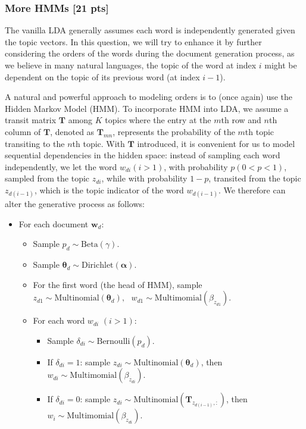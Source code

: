 \documentclass[10pt]{article}
\begin{document}
\subsubsection{More HMMs [21 pts]}
The vanilla LDA generally assumes each word is independently generated given the topic vectors. In this question, we will try to enhance it by further considering the orders of the words during the document generation process, as we believe in many natural languages, the topic of the word at index $i$ might be dependent on the topic of its previous word (at index $i-1$).

A natural and powerful approach to modeling orders is to (once again) use the Hidden Markov Model (HMM). To incorporate HMM into LDA, we assume a transit matrix $\bm{T}$ among $K$ topics where the entry at the $m$th row and $n$th column of $\bm{T}$, denoted as $\bm{T}_{mn}$, represents the probability of the $m$th topic transiting to the $n$th topic. With $\bm{T}$ introduced, it is convenient for us to model sequential dependencies in the hidden space: instead of sampling each word independently, we let the word $w_{di} (i > 1)$, with probability $p (0 < p <1)$, sampled from the topic $z_{di}$, while with probability $1-p$, transited from the topic $z_{d(i-1)}$, which is the topic indicator of the word $w_{d(i-1)}$. We therefore can alter the generative process as follows:
\begin{itemize}
\item For each document $\bm{w}_d$:
\begin{itemize}
\item Sample $p_d \sim \mbox{Beta}(\gamma)$.
\item Sample $\bm{\theta}_d \sim \mbox{Dirichlet}(\bm{\alpha})$.
\item For the first word (the head of HMM), sample $z_{d1} \sim \mbox{Multinomial}(\bm{\theta}_d), \mbox{ } w_{d1} \sim \mbox{Multimomial}(\beta_{z_{d1}})$.
\item For each word $w_{di}$ $(i > 1)$:
\begin{itemize}
\item Sample $\delta_{di}\sim \mbox{Bernoulli}(p_d)$.
\item If $\delta_{di} = 1$: sample $z_{di}\sim \mbox{Multinomial}(\bm{\theta}_d)$, then $w_{di} \sim \mbox{Multimomial}(\beta_{z_{di}})$.
\item If $\delta_{di} = 0$: sample $z_{di} \sim \mbox{Multinomial}(\bm{T}_{z_{d(i-1)}, :})$, then $w_i \sim \mbox{Multimomial}(\beta_{z_{di}})$.
\end{itemize}
\end{itemize}
\end{itemize}
\end{document}
